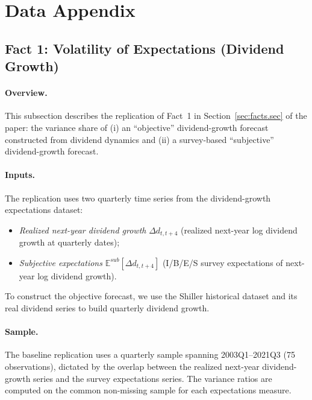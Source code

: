 \section{Data Appendix}\label{app:data}

\subsection{Fact 1: Volatility of Expectations (Dividend Growth)}\label{app:data_fact1_expectations_volatility}

\paragraph{Overview.}
This subsection describes the replication of Fact~1 in Section~\ref{sec:facts.sec} of the paper: the variance share of (i) an ``objective'' dividend-growth forecast constructed from dividend dynamics and (ii) a survey-based ``subjective'' dividend-growth forecast.

\paragraph{Inputs.}
The replication uses two quarterly time series from the dividend-growth expectations dataset:
\begin{itemize}
\item \textit{Realized next-year dividend growth} \(\Delta d_{t,t+4}\) (realized next-year log dividend growth at quarterly dates);
\item \textit{Subjective expectations} \(\mathbb{E}^{sub}[\Delta d_{t,t+4}]\) (I/B/E/S survey expectations of next-year log dividend growth).
\end{itemize}
To construct the objective forecast, we use the Shiller historical dataset and its real dividend series to build quarterly dividend growth.

\paragraph{Sample.}
The baseline replication uses a quarterly sample spanning 2003Q1--2021Q3 (75 observations), dictated by the overlap between the realized next-year dividend-growth series and the survey expectations series. The variance ratios are computed on the common non-missing sample for each expectations measure.

